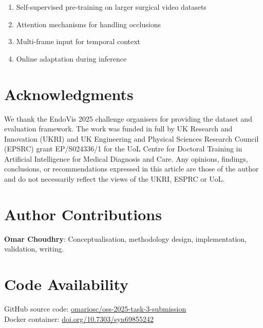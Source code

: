 \documentclass[11pt]{article}
\begin{document}
\begin{enumerate}[noitemsep]
    \item Self-supervised pre-training on larger surgical video datasets
    \item Attention mechanisms for handling occlusions
    \item Multi-frame input for temporal context
    \item Online adaptation during inference
\end{enumerate}

\section*{Acknowledgments}

We thank the EndoVis 2025 challenge organisers for providing the dataset and evaluation framework. The work was funded in full by UK Research and Innovation (UKRI) and UK Engineering and Physical Sciences Research Council (EPSRC) grant EP/S024336/1 for the UoL Centre for Doctoral Training in Artificial Intelligence for Medical Diagnosis and Care. Any opinions, findings, conclusions, or recommendations expressed in this article are those of the author and do not necessarily reflect the views of the UKRI, ESPRC or UoL.




\section*{Author Contributions}

\textbf{Omar Choudhry}: Conceptualisation, methodology design, implementation, validation, writing.

\section*{Code Availability}

GitHub source code: \href{https://github.com/omariosc/oss-2025-task-3-submission}{omariosc/oss-2025-task-3-submission} \\
Docker container: \href{https://doi.org/10.7303/syn69855242}{doi.org/10.7303/syn69855242}
\end{document}
